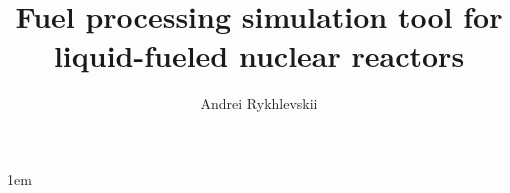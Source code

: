 \documentclass[edeposit,fullpage,12pt]{uiucthesis2009}
\title{Fuel processing simulation tool for liquid-fueled nuclear reactors}
\author{Andrei Rykhlevskii}
\begin{document}

%
\maketitle

\parindent 1em%

\frontmatter

%
\begin{abstract}

\end{abstract}

%

%
%
																			
			
%
\tableofcontents

%

%

%
\end{document}
